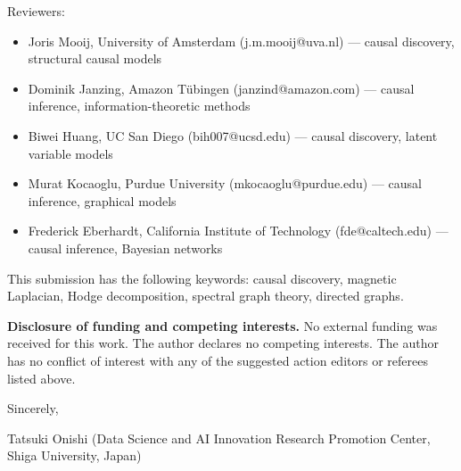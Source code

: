 Reviewers:
\begin{itemize}
  \item Joris Mooij, University of Amsterdam (j.m.mooij@uva.nl) --- causal discovery, structural causal models
  \item Dominik Janzing, Amazon T\"ubingen (janzind@amazon.com) --- causal inference, information-theoretic methods
  \item Biwei Huang, UC San Diego (bih007@ucsd.edu) --- causal discovery, latent variable models
  \item Murat Kocaoglu, Purdue University (mkocaoglu@purdue.edu) --- causal inference, graphical models
  \item Frederick Eberhardt, California Institute of Technology (fde@caltech.edu) --- causal inference, Bayesian networks
\end{itemize}

This submission has the following keywords: causal discovery, magnetic Laplacian, Hodge decomposition, spectral graph theory, directed graphs.

\medskip

\textbf{Disclosure of funding and competing interests.}
No external funding was received for this work.
The author declares no competing interests.
The author has no conflict of interest with any of the suggested action
editors or referees listed above.

\bigskip

Sincerely,

\medskip

Tatsuki Onishi (Data Science and AI Innovation Research Promotion Center, Shiga University, Japan)


